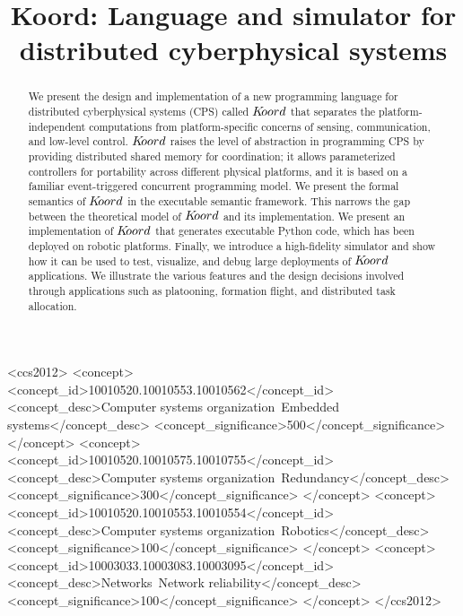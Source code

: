 \documentclass[sigconf]{acmart}
\begin{document}
%
\title{Koord: Language and simulator for distributed cyberphysical systems}



%
\begin{abstract}
We present the design and implementation of a  new programming  language for distributed cyberphysical systems (CPS) called $K\kern-2pt oord$ that separates the platform-independent  computations from platform-specific concerns of sensing, communication, and low-level  control. $K\kern-2pt oord$ raises the level of abstraction in programming CPS by providing distributed shared memory for coordination; it allows parameterized controllers for portability across different physical platforms, and it is based on a familiar  event-triggered concurrent programming model. We present the formal semantics of $K\kern-2pt oord$ in the \K executable semantic framework. This  narrows the gap between the theoretical model of $K\kern-2pt oord$  and its implementation. We  present an implementation of $K\kern-2pt oord$ that generates executable Python code, which has been deployed on robotic platforms.  Finally, we  introduce a high-fidelity simulator and show how it can be used to test, visualize, and debug large deployments of $K\kern-2pt oord$ applications.  
We illustrate the various features and the design decisions involved through applications such as platooning, formation flight, and distributed task allocation. 
\end{abstract}

%
%
\begin{CCSXML}
<ccs2012>
 <concept>
  <concept_id>10010520.10010553.10010562</concept_id>
  <concept_desc>Computer systems organization~Embedded systems</concept_desc>
  <concept_significance>500</concept_significance>
 </concept>
 <concept>
  <concept_id>10010520.10010575.10010755</concept_id>
  <concept_desc>Computer systems organization~Redundancy</concept_desc>
  <concept_significance>300</concept_significance>
 </concept>
 <concept>
  <concept_id>10010520.10010553.10010554</concept_id>
  <concept_desc>Computer systems organization~Robotics</concept_desc>
  <concept_significance>100</concept_significance>
 </concept>
 <concept>
  <concept_id>10003033.10003083.10003095</concept_id>
  <concept_desc>Networks~Network reliability</concept_desc>
  <concept_significance>100</concept_significance>
 </concept>
</ccs2012>
\end{CCSXML}
\end{document}
